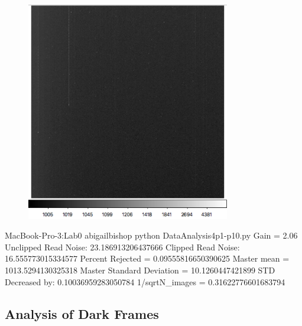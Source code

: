 \documentclass[preprint]{aastex62}
\begin{document}
    
        \begin{figure}
          \centering
            \includegraphics[width=3.5in]{../images/pos10BIAS_master.png}
            \caption{}
          \label{fig:pos10BIAS_master}
        \end{figure}
    
    MacBook-Pro-3:Lab0 abigailbishop python DataAnalysis4p1-p10.py 
    Gain =  2.06
    Unclipped Read Noise:  23.186913206437666
    Clipped Read Noise:  16.555773015334577
    Percent Rejected = 0.09555816650390625
    Master mean =  1013.5294130325318
    Master Standard Deviation =  10.1260447421899
    STD Decreased by:  0.10036959283050784
    1/sqrt{N\_images} =  0.31622776601683794
    
  \subsection{Analysis of Dark Frames}
  
    
\end{document}
